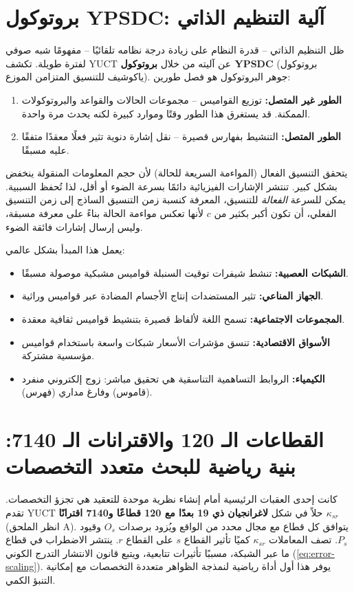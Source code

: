 \documentclass[11pt,a4paper]{article}
\theoremstyle{remark}
\begin{document}
	\section{بروتوكول YPSDC: آلية التنظيم الذاتي}
	\label{sec:ypsdc}
	
	ظل التنظيم الذاتي – قدرة النظام على زيادة درجة نظامه تلقائيًا – مفهومًا شبه صوفي لفترة طويلة. تكشف YUCT عن آليته من خلال \textbf{بروتوكول YPSDC} (بروتوكول ياكوشيف للتنسيق المتزامن الموزع). جوهر البروتوكول هو فصل طورين:
	\begin{enumerate}
		\item \textbf{الطور غير المتصل:} توزيع القواميس – مجموعات الحالات والقواعد والبروتوكولات الممكنة. قد يستغرق هذا الطور وقتًا وموارد كبيرة لكنه يحدث مرة واحدة.
		\item \textbf{الطور المتصل:} التنشيط بفهارس قصيرة – نقل إشارة دنوية تثير فعلًا معقدًا متفقًا عليه مسبقًا.
	\end{enumerate}
	
	يتحقق التنسيق الفعال (المواءمة السريعة للحالة) لأن حجم المعلومات المنقولة ينخفض بشكل كبير. تنتشر الإشارات الفيزيائية دائمًا بسرعة الضوء أو أقل، لذا تُحفظ السببية. يمكن للسرعة \emph{الفعالة} للتنسيق، المعرفة كنسبة زمن التنسيق الساذج إلى زمن التنسيق الفعلي، أن تكون أكبر بكثير من \(c\) لأنها تعكس مواءمة الحالة بناءً على معرفة مسبقة، وليس إرسال إشارات فائقة الضوء.
	
	يعمل هذا المبدأ بشكل عالمي:
	\begin{itemize}
		\item \textbf{الشبكات العصبية:} تنشط شيفرات توقيت السنبلة قواميس مشبكية موصولة مسبقًا.
		\item \textbf{الجهاز المناعي:} تثير المستضدات إنتاج الأجسام المضادة عبر قواميس وراثية.
		\item \textbf{المجموعات الاجتماعية:} تسمح اللغة لألفاظ قصيرة بتنشيط قواميس ثقافية معقدة.
		\item \textbf{الأسواق الاقتصادية:} تنسق مؤشرات الأسعار شبكات واسعة باستخدام قواميس مؤسسية مشتركة.
		\item \textbf{الكيمياء:} الروابط التساهمية التناسقية هي تحقيق مباشر: زوج إلكتروني منفرد (قاموس) وفارغ مداري (فهرس).
	\end{itemize}
	
	\section{القطاعات الـ 120 والاقترانات الـ 7140: بنية رياضية للبحث متعدد التخصصات}
	\label{sec:sectors}
	
	كانت إحدى العقبات الرئيسية أمام إنشاء نظرية موحدة للتعقيد هي تجزؤ التخصصات. تقدم YUCT حلاً في شكل \textbf{لاغرانجيان ذي 19 بعدًا مع 120 قطاعًا و7140 اقترانًا \(\kappa_{sr}\)} (انظر الملحق A). يتوافق كل قطاع مع مجال محدد من الواقع ويُزود برصدات \(O_s\) وقيود \(P_s\). تصف المعاملات \(\kappa_{sr}\) كميًا تأثير القطاع \(s\) على القطاع \(r\). ينتشر الاضطراب في قطاع ما عبر الشبكة، مسببًا تأثيرات تتابعية، ويتبع قانون الانتشار التدرج الكوني (\ref{eq:error-scaling}). يوفر هذا أول أداة رياضية لنمذجة الظواهر متعددة التخصصات مع إمكانية التنبؤ الكمي.
	
\end{document}
